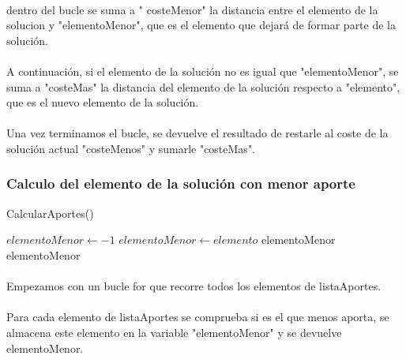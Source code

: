 \documentclass{article}
\begin{document}
		\paragraph{}dentro del bucle se suma a " costeMenor" la distancia entre el elemento de la solucion y "elementoMenor", que es el elemento que dejará de formar parte de la solución.
		
		\paragraph{}A continuación, si el elemento de la solución no es igual que "elementoMenor", se suma a "costeMas" la distancia del elemento de la solución respecto a "elemento", que es el nuevo elemento de la solución. 
		
		\paragraph{}Una vez terminamos el bucle, se devuelve el resultado de restarle al coste de la solución actual "costeMenos" y sumarle "costeMas".
		
		\subsubsection{Calculo del elemento de la solución con menor aporte}
		
		\begin{algorithm}[H]
			\caption{CalcularAportes()}
			\begin{algorithmic}
				\STATE $elementoMenor \leftarrow -1$
				\STATE $elementoMenor \leftarrow elemento$
				\RETURN elementoMenor
				\ENDIF
				\ENDFOR
				\RETURN elementoMenor
			\end{algorithmic}
		\end{algorithm}
	
		\paragraph{}Empezamos con un bucle for que recorre todos los elementos de listaAportes.
		
		\paragraph{}Para cada elemento de listaAportes se comprueba si es el que menos aporta, se almacena este elemento en la variable "elementoMenor" y se devuelve elementoMenor.
		
\end{document}
